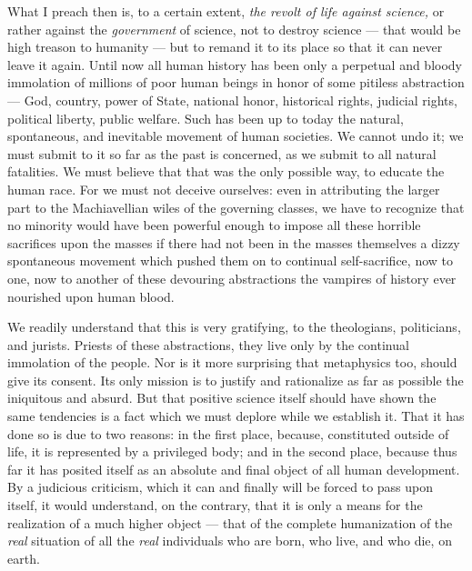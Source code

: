 \documentclass[12pt]{report}
\begin{document}
What I preach then is, to a certain extent, \emph{the revolt of life against science,} or rather against the \emph{government} of science, not to destroy science — that would be high treason to humanity — but to remand it to its place so that it can never leave it again. Until now all human history has been only a perpetual and bloody immolation of millions of poor human beings in honor of some pitiless abstraction — God, country, power of State, national honor, historical rights, judicial rights, political liberty, public welfare. Such has been up to today the natural, spontaneous, and inevitable movement of human societies. We cannot undo it; we must submit to it so far as the past is concerned, as we submit to all natural fatalities. We must believe that that was the only possible way, to educate the human race. For we must not deceive ourselves: even in attributing the larger part to the Machiavellian wiles of the governing classes, we have to recognize that no minority would have been powerful enough to impose all these horrible sacrifices upon the masses if there had not been in the masses themselves a dizzy spontaneous movement which pushed them on to continual self-sacrifice, now to one, now to another of these devouring abstractions the vampires of history ever nourished upon human blood.


We readily understand that this is very gratifying, to the theologians, politicians, and jurists. Priests of these abstractions, they live only by the continual immolation of the people. Nor is it more surprising that metaphysics too, should give its consent. Its only mission is to justify and rationalize as far as possible the iniquitous and absurd. But that positive science itself should have shown the same tendencies is a fact which we must deplore while we establish it. That it has done so is due to two reasons: in the first place, because, constituted outside of life, it is represented by a privileged body; and in the second place, because thus far it has posited itself as an absolute and final object of all human development. By a judicious criticism, which it can and finally will be forced to pass upon itself, it would understand, on the contrary, that it is only a means for the realization of a much higher object — that of the complete humanization of the \emph{real} situation of all the \emph{real} individuals who are born, who live, and who die, on earth.
\end{document}
